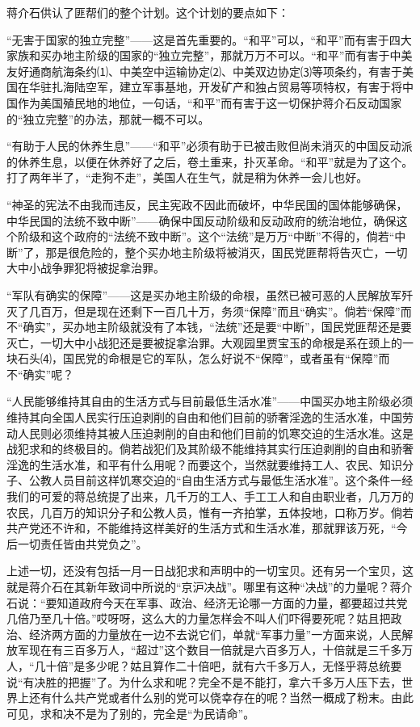 \documentclass[UTF-8, a5paper, 12pt]{ctexart}
\begin{document}
蒋介石供认了匪帮们的整个计划。这个计划的要点如下：

“无害于国家的独立完整”——这是首先重要的。“和平”可以，“和平”而有害于四大家族和买办地主阶级的国家的“独立完整”，那就万万不可以。“和平”而有害于中美友好通商航海条约⑴、中美空中运输协定⑵、中美双边协定⑶等项条约，有害于美国在华驻扎海陆空军，建立军事基地，开发矿产和独占贸易等项特权，有害于将中国作为美国殖民地的地位，一句话，“和平”而有害于这一切保护蒋介石反动国家的“独立完整”的办法，那就一概不可以。

“有助于人民的休养生息”——“和平”必须有助于已被击败但尚未消灭的中国反动派的休养生息，以便在休养好了之后，卷土重来，扑灭革命。“和平”就是为了这个。打了两年半了，“走狗不走”，美国人在生气，就是稍为休养一会儿也好。

“神圣的宪法不由我而违反，民主宪政不因此而破坏，中华民国的国体能够确保，中华民国的法统不致中断”——确保中国反动阶级和反动政府的统治地位，确保这个阶级和这个政府的“法统不致中断”。这个“法统”是万万“中断”不得的，倘若“中断”了，那是很危险的，整个买办地主阶级将被消灭，国民党匪帮将告灭亡，一切大中小战争罪犯将被捉拿治罪。

“军队有确实的保障”——这是买办地主阶级的命根，虽然已被可恶的人民解放军歼灭了几百万，但是现在还剩下一百几十万，务须“保障”而且“确实”。倘若“保障”而不“确实”，买办地主阶级就没有了本钱，“法统”还是要“中断”，国民党匪帮还是要灭亡，一切大中小战犯还是要被捉拿治罪。大观园里贾宝玉的命根是系在颈上的一块石头⑷，国民党的命根是它的军队，怎么好说不“保障”，或者虽有“保障”而不“确实”呢？

“人民能够维持其自由的生活方式与目前最低生活水准”——中国买办地主阶级必须维持其向全国人民实行压迫剥削的自由和他们目前的骄奢淫逸的生活水准，中国劳动人民则必须维持其被人压迫剥削的自由和他们目前的饥寒交迫的生活水准。这是战犯求和的终极目的。倘若战犯们及其阶级不能维持其实行压迫剥削的自由和骄奢淫逸的生活水准，和平有什么用呢？而要这个，当然就要维持工人、农民、知识分子、公教人员目前这样饥寒交迫的“自由生活方式与最低生活水准”。这个条件一经我们的可爱的蒋总统提了出来，几千万的工人、手工工人和自由职业者，几万万的农民，几百万的知识分子和公教人员，惟有一齐拍掌，五体投地，口称万岁。倘若共产党还不许和，不能维持这样美好的生活方式和生活水准，那就罪该万死，“今后一切责任皆由共党负之”。

上述一切，还没有包括一月一日战犯求和声明中的一切宝贝。还有另一个宝贝，这就是蒋介石在其新年致词中所说的“京沪决战”。哪里有这种“决战”的力量呢？蒋介石说：“要知道政府今天在军事、政治、经济无论哪一方面的力量，都要超过共党几倍乃至几十倍。”哎呀呀，这么大的力量怎样会不叫人们吓得要死呢？姑且把政治、经济两方面的力量放在一边不去说它们，单就“军事力量”一方面来说，人民解放军现在有三百多万人，“超过”这个数目一倍就是六百多万人，十倍就是三千多万人，“几十倍”是多少呢？姑且算作二十倍吧，就有六千多万人，无怪乎蒋总统要说“有决胜的把握”了。为什么求和呢？完全不是不能打，拿六千多万人压下去，世界上还有什么共产党或者什么别的党可以侥幸存在的呢？当然一概成了粉末。由此可见，求和决不是为了别的，完全是“为民请命”。
\end{document}
